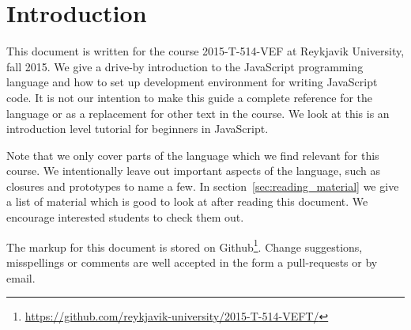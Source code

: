 \section{Introduction}\label{sec:introduction}
This document is written for the course 2015-T-514-VEF at Reykjavik University, fall 2015. We give a drive-by introduction to the JavaScript programming language and how to set up development environment for writing JavaScript code. It is not our intention to make this guide a complete reference for the language or as a replacement for other text in the course. We look at this is an introduction level tutorial for beginners in JavaScript.

Note that we only cover parts of the language which we find relevant for this course. We intentionally leave out important aspects of the language, such as closures and prototypes to name a few. In section~\ref{sec:reading_material} we give a list of material which is good to look at after reading this document. We encourage interested students to check them out.

The markup for this document is stored on Github\footnote{\url{https://github.com/reykjavik-university/2015-T-514-VEFT/}}. Change suggestions, misspellings or comments are well accepted in the form a pull-requests or by email.
